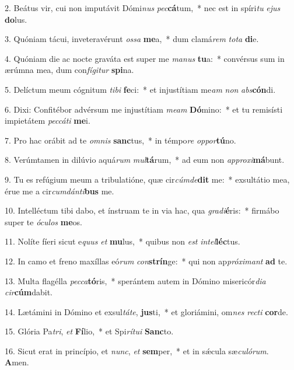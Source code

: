 2. Beátus vir, cui non imputávit Dómi\textit{nus} \textit{pec}\textbf{cá}tum,~*  nec est in spíri\textit{tu} \textit{e}\textit{jus} \textbf{do}lus.\

3. Quóniam tácui, inveteravérunt \textit{os}\textit{sa} \textbf{me}a,~*  dum clamá\textit{rem} \textit{to}\textit{ta} \textbf{di}e.\

4. Quóniam die ac nocte graváta est super me \textit{ma}\textit{nus} \textbf{tu}a:~*  convérsus sum in ærúmna mea, dum con\textit{fí}\textit{gi}\textit{tur} \textbf{spi}na.\

5. Delíctum meum cógnitum \textit{ti}\textit{bi} \textbf{fe}ci:~*  et injustítiam me\textit{am} \textit{non} \textit{abs}\textbf{cón}di.\

6. Dixi: Confitébor advérsum me injustítiam \textit{me}\textit{am} \textbf{Dó}mino:~*  et tu remisísti impietátem \textit{pec}\textit{cá}\textit{ti} \textbf{me}i.\

7. Pro hac orábit ad te \textit{om}\textit{nis} \textbf{sanc}tus,~*  in témpo\textit{re} \textit{op}\textit{por}\textbf{tú}no.\

8. Verúmtamen in dilúvio aquá\textit{rum} \textit{mul}\textbf{tá}rum,~*  ad eum non \textit{ap}\textit{pro}\textit{xi}\textbf{má}bunt.\

9. Tu es refúgium meum a tribulatióne, quæ cir\textit{cúm}\textit{de}\textbf{dit} me:~*  exsultátio mea, érue me a cir\textit{cum}\textit{dán}\textit{ti}\textbf{bus} me.\

10. Intelléctum tibi dabo, et ínstruam te in via hac, qua \textit{gra}\textit{di}\textbf{é}ris:~*  firmábo super te \textit{ó}\textit{cu}\textit{los} \textbf{me}os.\

11. Nolíte fíeri sicut e\textit{quus} \textit{et} \textbf{mu}lus,~*  quibus non \textit{est} \textit{in}\textit{tel}\textbf{léc}tus.\

12. In camo et freno maxíllas eó\textit{rum} \textit{con}\textbf{strín}ge:~*  qui non ap\textit{pró}\textit{xi}\textit{mant} \textbf{ad} te.\

13. Multa flagélla \textit{pec}\textit{ca}\textbf{tó}ris,~*  sperántem autem in Dómino misericór\textit{di}\textit{a} \textit{cir}\textbf{cúm}dabit.\

14. Lætámini in Dómino et exsul\textit{tá}\textit{te}, \textbf{jus}ti,~*  et gloriámini, om\textit{nes} \textit{rec}\textit{ti} \textbf{cor}de.\

15. Glória Pa\textit{tri}, \textit{et} \textbf{Fí}lio,~*  et Spi\textit{rí}\textit{tu}\textit{i} \textbf{Sanc}to.\

16. Sicut erat in princípio, et \textit{nunc}, \textit{et} \textbf{sem}per,~*  et in sǽcula sæ\textit{cu}\textit{ló}\textit{rum}. \textbf{A}men.\

